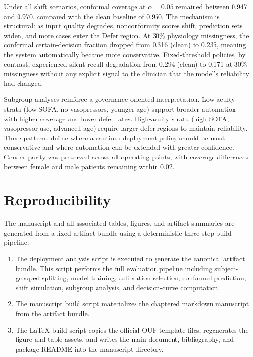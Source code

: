 \begin{appendices}
Under all shift scenarios, conformal coverage at $\alpha = 0.05$ remained between 0.947 and 0.970, compared with the clean baseline of 0.950. The mechanism is structural: as input quality degrades, nonconformity scores shift, prediction sets widen, and more cases enter the Defer region. At 30\% physiology missingness, the conformal certain-decision fraction dropped from 0.316 (clean) to 0.235, meaning the system automatically became more conservative. Fixed-threshold policies, by contrast, experienced silent recall degradation from 0.294 (clean) to 0.171 at 30\% missingness without any explicit signal to the clinician that the model's reliability had changed.

Subgroup analyses reinforce a governance-oriented interpretation. Low-acuity strata (low SOFA, no vasopressors, younger age) support broader automation with higher coverage and lower defer rates. High-acuity strata (high SOFA, vasopressor use, advanced age) require larger defer regions to maintain reliability. These patterns define where a cautious deployment policy should be most conservative and where automation can be extended with greater confidence. Gender parity was preserved across all operating points, with coverage differences between female and male patients remaining within 0.02.

\section{Reproducibility}\label{app:repro}

The manuscript and all associated tables, figures, and artifact summaries are generated from a fixed artifact bundle using a deterministic three-step build pipeline:
\begin{enumerate}
\item The deployment analysis script is executed to generate the canonical artifact bundle. This script performs the full evaluation pipeline including subject-grouped splitting, model training, calibration selection, conformal prediction, shift simulation, subgroup analysis, and decision-curve computation.
\item The manuscript build script materializes the chaptered markdown manuscript from the artifact bundle.
\item The \LaTeX{} build script copies the official OUP template files, regenerates the figure and table assets, and writes the main document, bibliography, and package README into the manuscript directory.
\end{enumerate}


\end{appendices}
